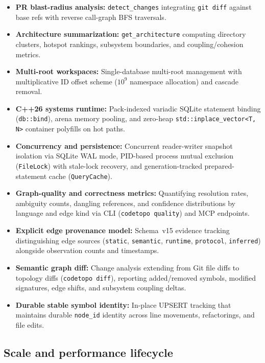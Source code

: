 \begin{itemize}
        and diagnostics).
  \item \textbf{PR blast-radius analysis:} \texttt{detect\_changes} integrating
        \texttt{git diff} against base refs with reverse call-graph BFS traversals.
  \item \textbf{Architecture summarization:} \texttt{get\_architecture} computing
        directory clusters, hotspot rankings, subsystem boundaries, and coupling/cohesion metrics.
  \item \textbf{Multi-root workspaces:} Single-database multi-root management with
        multiplicative ID offset scheme ($10^9$ namespace allocation) and cascade removal.
  \item \textbf{C++26 systems runtime:} Pack-indexed variadic SQLite statement
        binding (\texttt{db::bind}), arena memory pooling, and zero-heap
        \texttt{std::inplace\_vector<T, N>} container polyfills on hot paths.
  \item \textbf{Concurrency and persistence:} Concurrent reader-writer snapshot isolation
        via SQLite WAL mode, PID-based process mutual exclusion (\texttt{FileLock})
        with stale-lock recovery, and generation-tracked prepared-statement cache (\texttt{QueryCache}).
  \item \textbf{Graph-quality and correctness metrics:} Quantifying resolution rates,
        ambiguity counts, dangling references, and confidence distributions by language
        and edge kind via CLI (\texttt{codetopo quality}) and MCP endpoints.
  \item \textbf{Explicit edge provenance model:} Schema~v15 evidence tracking distinguishing
        edge sources (\texttt{static}, \texttt{semantic}, \texttt{runtime}, \texttt{protocol},
        \texttt{inferred}) alongside observation counts and timestamps.
  \item \textbf{Semantic graph diff:} Change analysis extending from Git file diffs to
        topology diffs (\texttt{codetopo diff}), reporting added/removed symbols, modified
        signatures, edge shifts, and subsystem coupling deltas.
  \item \textbf{Durable stable symbol identity:} In-place UPSERT tracking that
        maintains durable \texttt{node\_id} identity across line movements, refactorings, and file edits.
\end{itemize}

\subsection{Scale and performance lifecycle}
\label{sec:scale-lifecycle}


